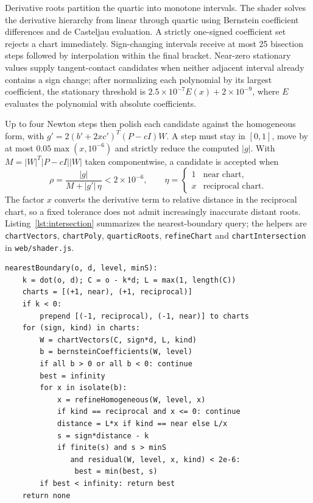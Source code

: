 \documentclass{jcgt}
\providecommand{\passthrough}[1]{#1}
\begin{document}
Derivative roots partition the quartic into monotone intervals. The
shader solves the derivative hierarchy from linear through quartic using
Bernstein coefficient differences and de Casteljau evaluation. A
strictly one-signed coefficient set rejects a chart immediately.
Sign-changing intervals receive at most 25 bisection steps followed by
interpolation within the final bracket. Near-zero stationary values
supply tangent-contact candidates when neither adjacent interval already
contains a sign change; after normalizing each polynomial by its largest
coefficient, the stationary threshold is
\(2.5\times10^{-7}E(x)+2\times10^{-9}\), where \(E\) evaluates the
polynomial with absolute coefficients.

Up to four Newton steps then polish each candidate against the
homogeneous form, with \(g'=2(b'+2xc')^T(P-cI)W\). A step must stay in
\([0,1]\), move by at most \(0.05\max(x,10^{-6})\) and strictly reduce
the computed \(|g|\). With \(M=|W|^T|P-cI||W|\) taken componentwise, a
candidate is accepted when \[
\rho=\frac{|g|}{M+|g'|\,\eta}<2\times10^{-6},\qquad
\eta=\begin{cases}1&\text{near chart},\\x&\text{reciprocal chart}.\end{cases}
\] The factor \(x\) converts the derivative term to relative distance in
the reciprocal chart, so a fixed tolerance does not admit increasingly
inaccurate distant roots. Listing~\ref{lst:intersection} summarizes the nearest-boundary
query; the helpers are \passthrough{\lstinline!chartVectors!},
\passthrough{\lstinline!chartPoly!},
\passthrough{\lstinline!quarticRoots!},
\passthrough{\lstinline!refineChart!} and
\passthrough{\lstinline!chartIntersection!} in
\passthrough{\lstinline!web/shader.js!}.

\begin{lstlisting}[caption={Nearest finite intersection with one boundary (Section~\ref{isolation-refinement-and-acceptance}).}, label=lst:intersection]
nearestBoundary(o, d, level, minS):
    k = dot(o, d); C = o - k*d; L = max(1, length(C))
    charts = [(+1, near), (+1, reciprocal)]
    if k < 0:
        prepend [(-1, reciprocal), (-1, near)] to charts
    for (sign, kind) in charts:
        W = chartVectors(C, sign*d, L, kind)
        b = bernsteinCoefficients(W, level)
        if all b > 0 or all b < 0: continue
        best = infinity
        for x in isolate(b):
            x = refineHomogeneous(W, level, x)
            if kind == reciprocal and x <= 0: continue
            distance = L*x if kind == near else L/x
            s = sign*distance - k
            if finite(s) and s > minS
               and residual(W, level, x, kind) < 2e-6:
                best = min(best, s)
        if best < infinity: return best
    return none
\end{lstlisting}
\end{document}
